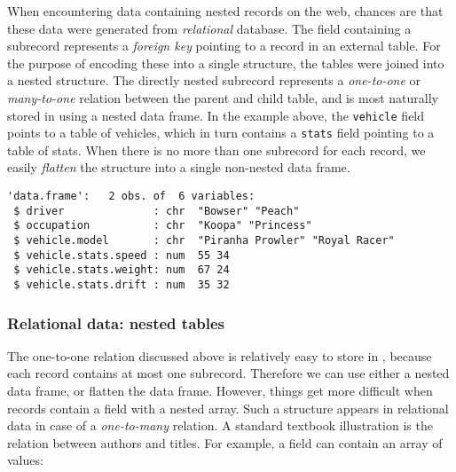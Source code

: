  When encountering \JSON data containing nested records on the web, chances are that these data were generated from \emph{relational} database. The \JSON field containing a subrecord represents a \emph{foreign key} pointing to a record in an external table. For the purpose of encoding these into a single \JSON structure, the tables were joined into a nested structure. The directly nested subrecord represents a \emph{one-to-one} or \emph{many-to-one} relation between the parent and child table, and is most naturally stored in \R using a nested data frame. In the example above, the \texttt{vehicle} field points to a table of vehicles, which in turn contains a \texttt{stats} field pointing to a table of stats. When there is no more than one subrecord for each record, we easily \emph{flatten} the structure into a single non-nested data frame.

\begin{knitrout}\mycodesize
{}\color{fgcolor}\begin{kframe}
\begin{alltt}
 \hlkwb{<-}   \hlstd{=} \hlstd{)}
\end{alltt}
\begin{verbatim}
'data.frame':	2 obs. of  6 variables:
 $ driver              : chr  "Bowser" "Peach"
 $ occupation          : chr  "Koopa" "Princess"
 $ vehicle.model       : chr  "Piranha Prowler" "Royal Racer"
 $ vehicle.stats.speed : num  55 34
 $ vehicle.stats.weight: num  67 24
 $ vehicle.stats.drift : num  35 32
\end{verbatim}
\end{kframe}
\end{knitrout}


\subsubsection{Relational data: nested tables}

The one-to-one relation discussed above is relatively easy to store in \R, because each record contains at most one subrecord. Therefore we can use either a nested data frame, or flatten the data frame. However, things get more difficult when \JSON records contain a field with a nested array. Such a structure appears in relational data in case of a \emph{one-to-many} relation. A standard textbook illustration is the relation between authors and titles. For example, a field can contain an array of values:

